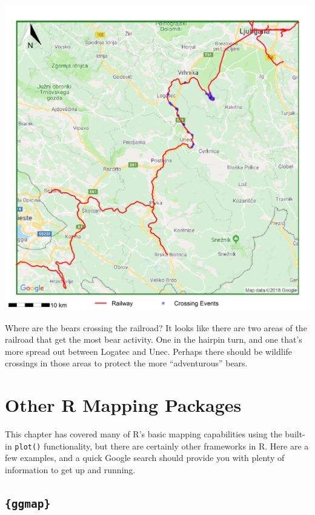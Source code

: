\documentclass[]{book}
\begin{document}
\begin{center}\includegraphics[width=41.67in]{img/FinalMap} \end{center}

Where are the bears crossing the railroad? It looks like there are two areas of the railroad that get the most bear activity. One in the hairpin turn, and one that's more spread out between Logatec and Unec. Perhaps there should be wildlife crossings in those areas to protect the more ``adventurous'' bears.

\hypertarget{other-r-mapping-packages}{%
\section{Other R Mapping Packages}\label{other-r-mapping-packages}}

This chapter has covered many of R's basic mapping capabilities using the built-in \texttt{plot()} functionality, but there are certainly other frameworks in R. Here are a few examples, and a quick Google search should provide you with plenty of information to get up and running.

\hypertarget{ggmap}{%
\subsection{\texorpdfstring{\texttt{\{ggmap\}}}{\{ggmap\}}}\label{ggmap}}
\end{document}
